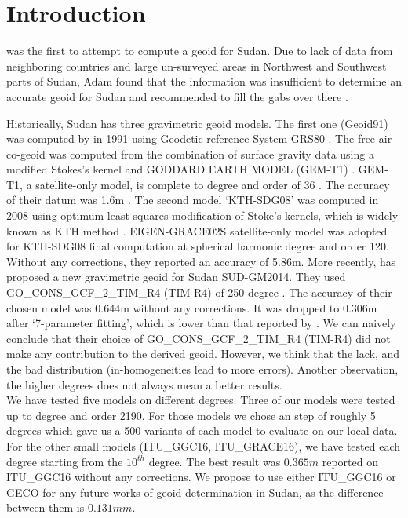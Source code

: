 \pagestyle{fancy}
\chapter{Introduction}
\label{Chapter1}

\cite{osman} was the first to attempt to compute a geoid for Sudan. Due to lack of data from neighboring countries and large un-surveyed areas in Northwest and Southwest parts of Sudan, Adam found that the information was insufficient to determine an accurate geoid for Sudan and recommended to fill the gabs over there \cite{ahmed_msc}. 

Historically, Sudan has three gravimetric geoid models. The first one (Geoid91) was computed by \cite{fashir} in 1991 using Geodetic reference System GRS80 \cite{moritz}. The free-air co-geoid was computed from the combination of surface gravity data using a modified Stokes's kernel and GODDARD EARTH MODEL (GEM-T1)  \cite{fashir}. GEM-T1, a satellite-only model, is complete to degree and order of 36 \cite{nasa}. The accuracy of their datum was 1.6m \cite{fashir, godah}. The second model `KTH-SDG08' was computed in 2008 using optimum least-squares modification of Stoke's kernels, which is widely known as KTH method \cite{ahmed_msc}. EIGEN-GRACE02S satellite-only model was adopted for KTH-SDG08 final computation at spherical harmonic degree and order 120. Without any corrections, they reported an accuracy of 5.86m.
More recently, \citep{godah} has proposed a new gravimetric geoid for Sudan SUD-GM2014. They used GO\_CONS\_GCF\_2\_TIM\_R4 (TIM-R4) of 250 degree \cite{pail}. The accuracy of their chosen model was 0.644m without any corrections. It was dropped to 0.306m after `7-parameter fitting', which is lower than that reported by \citep{ahmed_msc}. We can naively conclude that their choice of GO\_CONS\_GCF\_2\_TIM\_R4 (TIM-R4) did not make any contribution to the derived geoid. However, we think that the lack, and the bad distribution (in-homogeneities lead to more errors). Another observation, the higher degrees does not always mean a better results.
\\
We have tested five models on different degrees. Three of our models were tested up to degree and order 2190. For those models we chose an step of roughly 5 degrees which gave us a 500 variants of each model to evaluate on our local data. For the other small models (ITU\_GGC16, ITU\_GRACE16), we have tested each degree starting from the $10^{th}$ degree. The best result was $0.365m$ reported on ITU\_GGC16 without any corrections. We propose to use either ITU\_GGC16 or GECO for any future works of geoid determination in Sudan, as the difference between them is $0.131mm$.

